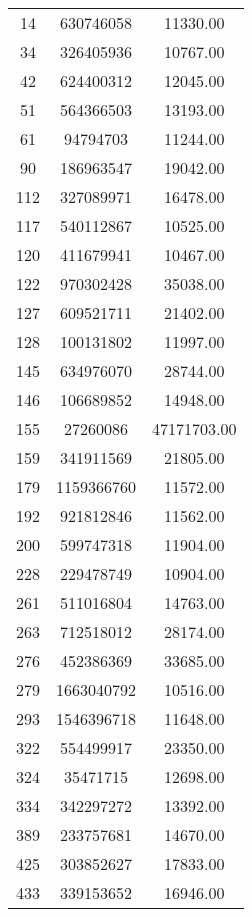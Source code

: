 \twocolumn
\begin{centering}
\tabletail{%
    \hline
}
\begin{supertabular}{|c|c|c|}
  14 & 630746058 & 11330.00 \\ 
  34 & 326405936 & 10767.00 \\ 
  42 & 624400312 & 12045.00 \\ 
  51 & 564366503 & 13193.00 \\ 
  61 & 94794703 & 11244.00 \\ 
  90 & 186963547 & 19042.00 \\ 
  112 & 327089971 & 16478.00 \\ 
  117 & 540112867 & 10525.00 \\ 
  120 & 411679941 & 10467.00 \\ 
  122 & 970302428 & 35038.00 \\ 
  127 & 609521711 & 21402.00 \\ 
  128 & 100131802 & 11997.00 \\ 
  145 & 634976070 & 28744.00 \\ 
  146 & 106689852 & 14948.00 \\ 
  155 & 27260086 & 47171703.00 \\ 
  159 & 341911569 & 21805.00 \\ 
  179 & 1159366760 & 11572.00 \\ 
  192 & 921812846 & 11562.00 \\ 
  200 & 599747318 & 11904.00 \\ 
  228 & 229478749 & 10904.00 \\ 
  261 & 511016804 & 14763.00 \\ 
  263 & 712518012 & 28174.00 \\ 
  276 & 452386369 & 33685.00 \\ 
  279 & 1663040792 & 10516.00 \\ 
  293 & 1546396718 & 11648.00 \\ 
  322 & 554499917 & 23350.00 \\ 
  324 & 35471715 & 12698.00 \\ 
  334 & 342297272 & 13392.00 \\ 
  389 & 233757681 & 14670.00 \\ 
  425 & 303852627 & 17833.00 \\ 
  433 & 339153652 & 16946.00 \\ 

\end{supertabular}
\end{centering}
